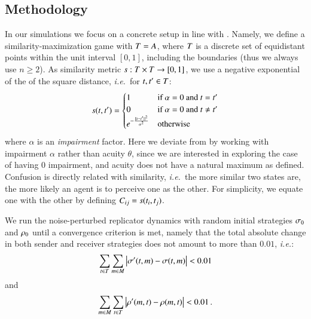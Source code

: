 \subsection{Methodology}
\newcommand{\impairment}{\alpha}
In our simulations we focus on a concrete setup in line with \cite{Correia2013}.
Namely, we define a similarity-maximization game with $T = A$, where $T$ is a discrete set of equidistant points within the unit interval $[0,1]$, including the boundaries (thus we always use $n \geq 2$).
As similarity metric $s:T \times T \rightarrow [0,1]$, we use a negative exponential of the of the square distance, \emph{i.e.}~for $t,t^\prime \in T$:
\begin{align*}
  s(\state,\state^\prime) =
    \begin{cases}
    1 & \textrm{if } \impairment = 0 \textrm{ and } \state = \state^\prime \\
    0 & \textrm{if } \impairment = 0 \textrm{ and } \state \neq \state^\prime \\
    e^{-\frac{\lVert \state - \state^\prime \rVert ^2}{\impairment^2}} & \textrm{otherwise} \\
    \end{cases}
\end{align*}
where $\impairment$ is an \emph{impairment} factor.
Here we deviate from \cite{Correia2013} by working with impairment $\impairment$ rather than acuity $\theta$, since we are interested in exploring the case of having $0$ impairment, and acuity does not have a natural maximum as defined.
Confusion is directly related with similarity, \emph{i.e.}~the more similar two states are, the more likely an agent is to perceive one as the other.
For simplicity, we equate one with the other by defining $C_{ij} = s(t_i,t_j)$.

We run the noise-perturbed replicator dynamics with random initial strategies $\sigma_0$ and $\rho_0$ until a convergence criterion is met, namely that the total absolute change in both sender and receiver strategies does not amount to more than $0.01$, \emph{i.e.}:
\begin{align*}
  \sum_{t \in T} \sum_{m \in M} \left| \sigma^\prime(t,m) - \sigma(t,m) \right| < 0.01
\end{align*}
and
\begin{align*}
  \sum_{m \in M} \sum_{t \in T} \left| \rho^\prime(m,t) - \rho(m,t) \right| < 0.01 \,.
\end{align*}

